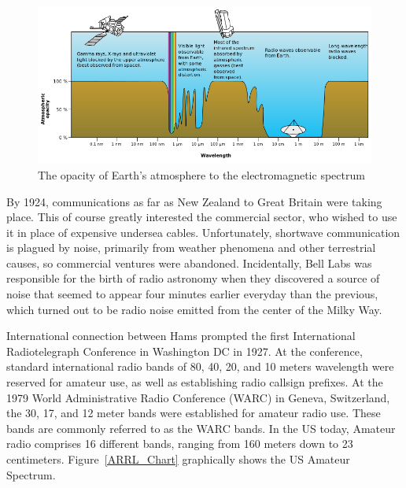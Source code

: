 \documentclass[letter,12pt]{article}
\begin{document}
		\begin{figure}[h!]
			\centering
			\includegraphics[width=\textwidth]{./PNGs/atmospheric_opacity.png}
			\caption{The opacity of Earth's atmosphere to the electromagnetic spectrum \cite{Wiki_Skywave}}
			\label{atmospheric_opactiy}
		\end{figure}		
		
		By 1924, communications as far as New Zealand to Great Britain were taking place.  This of course greatly interested the commercial sector, who wished to use it in place of expensive undersea cables.  Unfortunately, shortwave communication is plagued by noise, primarily from weather phenomena and other terrestrial causes, so commercial ventures were abandoned. Incidentally, Bell Labs was responsible for the birth of radio astronomy when they discovered a source of noise that seemed to appear four minutes earlier everyday than the previous, which turned out to be radio noise emitted from the center of the Milky Way. \cite{Finley_03}
		
		International connection between Hams prompted the first International Radiotelegraph Conference in Washington DC in 1927. At the conference, standard international radio bands of 80, 40, 20, and 10 meters wavelength were reserved for amateur use, as well as establishing radio callsign prefixes. \cite{Stewart_27} At the 1979 World Administrative Radio Conference (WARC) in Geneva, Switzerland, the 30, 17, and 12 meter bands were established for amateur radio use.  These bands are commonly referred to as the WARC bands. In the US today, Amateur radio comprises 16 different bands, ranging from 160 meters down to 23 centimeters. Figure~\ref{ARRL_Chart} graphically shows the US Amateur Spectrum.
		
\end{document}
